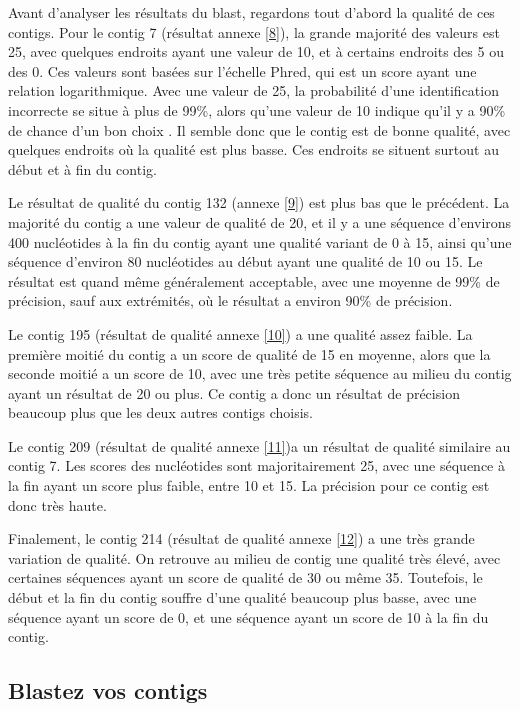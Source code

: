 \documentclass[11pt]{article} %
\begin{document}
Avant d'analyser les résultats du blast, regardons tout d'abord la qualité de ces contigs. Pour le contig 7 (résultat annexe \ref{8}),
la grande majorité des valeurs est 25, avec quelques endroits ayant une valeur de 10, et à certains endroits des 5 ou des 0.
Ces valeurs sont basées sur l'échelle Phred, qui est un score ayant une relation logarithmique. Avec une valeur de 25, 
la probabilité d'une identification incorrecte se situe à plus de 99\%, alors qu'une valeur de 10 indique qu'il y a 90\% de chance
d'un bon choix . Il semble donc que le contig est de bonne qualité, avec quelques endroits où la qualité est plus basse. Ces endroits
se situent surtout au début et à fin du contig.

Le résultat de qualité du contig 132 (annexe \ref{9}) est plus bas que le précédent. La majorité du contig a une valeur de qualité
de 20, et il y a une séquence d'environs 400 nucléotides à la fin du contig ayant une qualité variant de 0 à 15, ainsi qu'une séquence
d'environ 80 nucléotides au début ayant une qualité de 10 ou 15. Le résultat est quand même généralement acceptable, avec une moyenne de
99\% de précision, sauf aux extrémités, où le résultat a environ 90\% de précision.

Le contig 195 (résultat de qualité annexe \ref{10}) a une qualité assez faible. La première moitié du contig a un score de
qualité de 15 en moyenne, alors que la seconde moitié a un score de 10, avec une très petite séquence au milieu du contig
ayant un résultat de 20 ou plus. Ce contig a donc un résultat de précision beaucoup plus que les deux autres contigs choisis.

Le contig 209 (résultat de qualité annexe \ref{11})a un résultat de qualité similaire au contig 7. Les scores des nucléotides 
sont majoritairement 25, avec une séquence à la fin ayant un score plus faible, entre 10 et 15. La précision pour ce contig est
donc très haute.

Finalement, le contig 214 (résultat de qualité annexe \ref{12}) a une très grande variation de qualité. On retrouve au milieu
de contig une qualité très élevé, avec certaines séquences ayant un score de qualité de 30 ou même 35. Toutefois, le début et
la fin du contig souffre d'une qualité beaucoup plus basse, avec une séquence ayant un score de 0, et une séquence ayant un score
de 10 à la fin du contig.

\subsection[Blast des contigs]{Blastez vos contigs}
\end{document}
